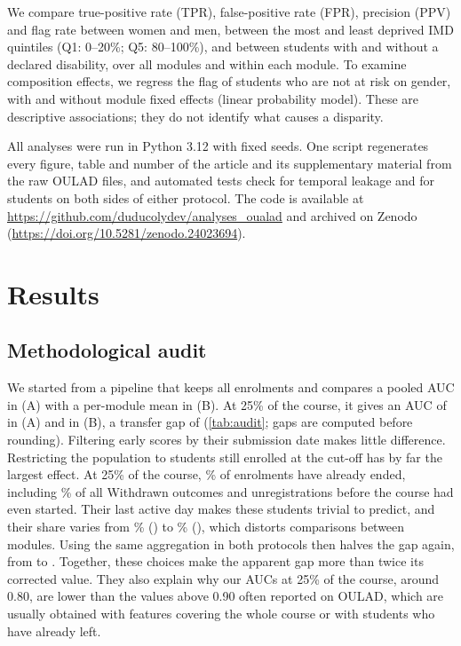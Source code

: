 \documentclass[fleqn,10pt]{JLA_article}
\newif\ifanonymous
\newcommand{\cA}{(A)}
\newcommand{\cB}{(B)}
\begin{document}
We compare true-positive rate (TPR), false-positive rate (FPR), precision (PPV) and flag rate between women and men, between the most and least deprived IMD quintiles (Q1: 0--20\%; Q5: 80--100\%), and between students with and without a declared disability, over all modules and within each module. To examine composition effects, we regress the flag of students who are not at risk on gender, with and without module fixed effects (linear probability model). These are descriptive associations; they do not identify what causes a disparity.

All analyses were run in Python 3.12 with fixed seeds. One script regenerates every figure, table and number of the article and its supplementary material from the raw OULAD files, and automated tests check for temporal leakage and for students on both sides of either protocol. The code is \ifanonymous available to reviewers on request and will be made public upon publication (link removed for double-blind review)\else available at \url{https://github.com/duducolydev/analyses_oualad} and archived on Zenodo (\url{https://doi.org/10.5281/zenodo.24023694})\fi.

\section{Results}
\label{sec:results}



\subsection{Methodological audit}
\label{sec:audit}
We started from a pipeline that keeps all enrolments and compares a pooled AUC in \cA{} with a per-module mean in \cB. At 25\% of the course, it gives an AUC of \resRefA{} in \cA{} and \resRefB{} in \cB, a transfer gap of \resRefGap{} (\cref{tab:audit}; gaps are computed before rounding). Filtering early scores by their submission date makes little difference. Restricting the population to students still enrolled at the cut-off has by far the largest effect. At 25\% of the course, \resPctGone\% of enrolments have already ended, including \resPctWithdrawnGone\% of all Withdrawn outcomes and \resNGoneBeforeStart{} unregistrations before the course had even started. Their last active day makes these students trivial to predict, and their share varies from \resGoneMin\% (\resGoneMinMod) to \resGoneMax\% (\resGoneMaxMod), which distorts comparisons between modules. Using the same aggregation in both protocols then halves the gap again, from \resPooledGap{} to \resSameAggGap. Together, these choices make the apparent gap more than twice its corrected value. They also explain why our AUCs at 25\% of the course, around 0.80, are lower than the values above 0.90 often reported on OULAD, which are usually obtained with features covering the whole course or with students who have already left.
\end{document}
